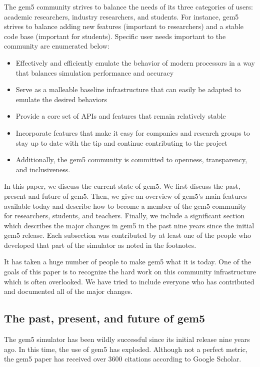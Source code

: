 The gem5 community strives to balance the needs of its three categories of users: academic researchers, industry researchers, and students.
For instance, gem5 strives to balance adding new features (important to researchers) and a stable code base (important for students).
Specific user needs important to the community are enumerated below:
\begin{itemize}
    \item Effectively and efficiently emulate the behavior of modern processors in a way that balances simulation performance and accuracy
    \item Serve as a malleable baseline infrastructure that can easily be adapted to emulate the desired behaviors
    \item Provide a core set of APIs and features that remain relatively stable
    \item Incorporate features that make it easy for companies and research groups to stay up to date with the tip and continue contributing to the project
    \item Additionally, the gem5 community is committed to openness, transparency, and inclusiveness.
\end{itemize}

In this paper, we discuss the current state of gem5.
We first discuss the past, present and future of gem5.
Then, we give an overview of gem5's main features available today and describe how to become a member of the gem5 community for researchers, students, and teachers.
Finally, we include a significant section which describes the major changes in gem5 in the past nine years since the initial gem5 release.
Each subsection was contributed by at least one of the people who developed that part of the simulator as noted in the footnotes.

It has taken a huge number of people to make gem5 what it is today.
One of the goals of this paper is to recognize the hard work on this community infrastructure which is often overlooked.
We have tried to include everyone who has contributed and documented all of the major changes.

\subsection{The past, present, and future of gem5}

The gem5 simulator has been wildly successful since its initial release nine years ago.
In this time, the use of gem5 has exploded.
Although not a perfect metric, the gem5 paper has received over 3600 citations according to Google Scholar.

